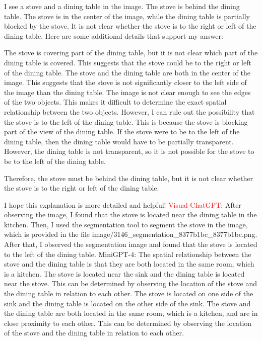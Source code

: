 \begin{enumerate}
    I see a stove and a dining table in the image.
    The stove is behind the dining table.
    The stove is in the center of the image, while the dining table is partially blocked by the stove.
    It is not clear whether the stove is to the right or left of the dining table.
    Here are some additional details that support my answer:
    
    The stove is covering part of the dining table, but it is not clear which part of the dining table is covered. This suggests that the stove could be to the right or left of the dining table.
    The stove and the dining table are both in the center of the image. This suggests that the stove is not significantly closer to the left side of the image than the dining table.
    The image is not clear enough to see the edges of the two objects. This makes it difficult to determine the exact spatial relationship between the two objects.
    However, I can rule out the possibility that the stove is to the left of the dining table. This is because the stove is blocking part of the view of the dining table. If the stove were to be to the left of the dining table, then the dining table would have to be partially transparent. However, the dining table is not transparent, so it is not possible for the stove to be to the left of the dining table.
    
    Therefore, the stove must be behind the dining table, but it is not clear whether the stove is to the right or left of the dining table.
    
    I hope this explanation is more detailed and helpful!
    \subitem \textcolor{red}{Visual ChatGPT}: After observing the image, I found that the stove is located near the dining table in the kitchen. Then, I used the segmentation tool to segment the stove in the image, which is provided in the file image/3146\_segmentation\_8377b1bc\_8377b1bc.png. After that, I observed the segmentation image and found that the stove is located to the left of the dining table.
    \subitem MiniGPT-4: The spatial relationship between the stove and the dining table is that they are both located in the same room, which is a kitchen. The stove is located near the sink and the dining table is located near the stove. This can be determined by observing the location of the stove and the dining table in relation to each other. The stove is located on one side of the sink and the dining table is located on the other side of the sink. The stove and the dining table are both located in the same room, which is a kitchen, and are in close proximity to each other. This can be determined by observing the location of the stove and the dining table in relation to each other.
\end{enumerate}
